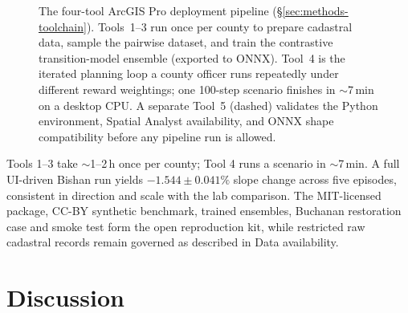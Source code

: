 \documentclass[11pt]{article}
\begin{document}
\begin{figure}[htbp]
{%
}
\caption{The four-tool ArcGIS Pro deployment pipeline (\S\ref{sec:methods-toolchain}). Tools~1--3 run once per county to prepare cadastral data, sample the pairwise dataset, and train the contrastive transition-model ensemble (exported to ONNX). Tool~4 is the iterated planning loop a county officer runs repeatedly under different reward weightings; one 100-step scenario finishes in $\sim$7\,min on a desktop CPU. A separate Tool~5 (dashed) validates the Python environment, Spatial Analyst availability, and ONNX shape compatibility before any pipeline run is allowed.}
\label{fig:toolchain}
\end{figure}

Tools 1--3 take $\sim$1--2\,h once per county; Tool 4 runs a scenario in $\sim$7\,min. A full UI-driven Bishan run yields $-1.544 \pm 0.041\%$ slope change across five episodes, consistent in direction and scale with the lab comparison. The MIT-licensed package, CC-BY synthetic benchmark, trained ensembles, Buchanan restoration case and smoke test form the open reproduction kit, while restricted raw cadastral records remain governed as described in Data availability.

\section{Discussion}\label{sec:discussion}
\end{document}
